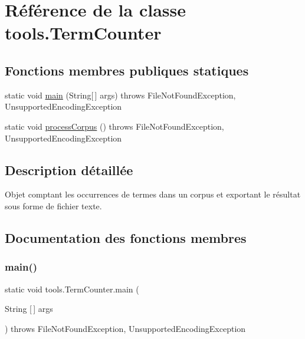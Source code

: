 \hypertarget{classtools_1_1TermCounter}{}\section{Référence de la classe tools.\+Term\+Counter}
\label{classtools_1_1TermCounter}
\subsection*{Fonctions membres publiques statiques}
\begin{DoxyCompactItemize}
\item 
static void \hyperlink{classtools_1_1TermCounter_af4f7b6c8183ded88b7f8a74364d9edd0}{main} (String\mbox{[}$\,$\mbox{]} args)  throws File\+Not\+Found\+Exception, Unsupported\+Encoding\+Exception 	
\item 
static void \hyperlink{classtools_1_1TermCounter_ad508a1ddd2bd468ca091b62c6799fb42}{process\+Corpus} ()  throws File\+Not\+Found\+Exception, Unsupported\+Encoding\+Exception 	
\end{DoxyCompactItemize}


\subsection{Description détaillée}
Objet comptant les occurrences de termes dans un corpus et exportant le résultat sous forme de fichier texte. 

\subsection{Documentation des fonctions membres}
\mbox{\label{classtools_1_1TermCounter_af4f7b6c8183ded88b7f8a74364d9edd0}} 
\subsubsection{\texorpdfstring{main()}{main()}}
{\footnotesize\ttfamily static void tools.\+Term\+Counter.\+main (\begin{DoxyParamCaption}\item[{String \mbox{[}$\,$\mbox{]}}]{args }\end{DoxyParamCaption}) throws File\+Not\+Found\+Exception, Unsupported\+Encoding\+Exception\hspace{0.3cm}{\ttfamily [static]}}

